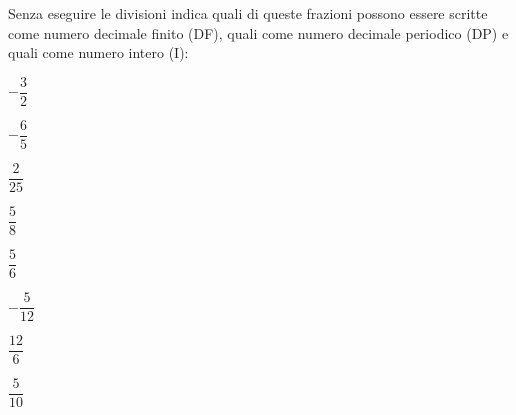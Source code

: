 \begin{esercizio}
 \label{ese:3.19}
 Senza eseguire le divisioni indica quali di queste frazioni possono essere 
 scritte come numero decimale finito (DF), quali come numero decimale 
 periodico (DP) e quali come numero intero (I):
 
 \begin{multicols}{2}
 \TabPositions{1cm}
 \begin{enumeratea}
 \item \(-\dfrac{3}{2}\) 
\tab\qquad\boxDF\qquad\boxDP\quad\enspace\enspace\boxI\vspace{1.1ex}
 \item \(-\dfrac{6}{5}\) 
\tab\qquad\boxDF\qquad\boxDP\quad\enspace\enspace\boxI\vspace{1.1ex}
 \item \(\dfrac{2}{25}\) 
\tab\qquad\boxDF\qquad\boxDP\quad\enspace\enspace\boxI\vspace{1.1ex}
 \item \(\dfrac{5}{8}\) \tab\qquad\boxDF\qquad\boxDP\quad\enspace\enspace\boxI
 \item \(\dfrac{5}{6}\) 
\tab\qquad\boxDF\qquad\boxDP\quad\enspace\enspace\boxI\vspace{1.1ex}
 \item \(-\dfrac{5}{12}\) 
\tab\qquad\boxDF\qquad\boxDP\quad\enspace\enspace\boxI\vspace{1.1ex}
 \item \(\dfrac{12}{6}\) 
\tab\qquad\boxDF\qquad\boxDP\quad\enspace\enspace\boxI\vspace{1.1ex}
 \item \(\dfrac{5}{10}\) \tab\qquad\boxDF\qquad\boxDP\quad\enspace\enspace\boxI
 \end{enumeratea}
 \end{multicols}
\end{esercizio}

